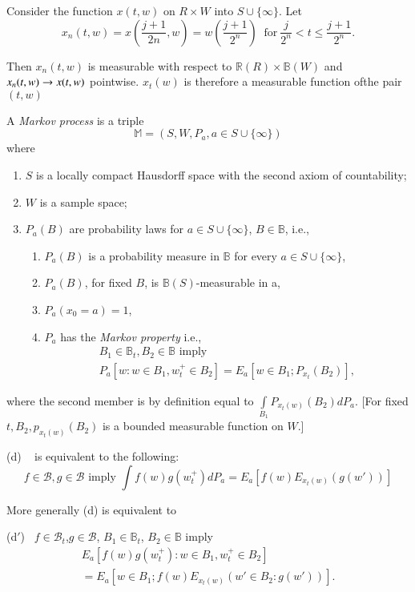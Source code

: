 Consider the function $x (t, w)$ on $R \times W$ into $S \cup \{\infty
\}$. Let  
$$
x_n (t, w) = x \left(\frac{j +1}{2n}, w \right)= w \left(\frac{j +
  1}{2^n}\right) ~\text{ for}~ \frac{j }{2^n}< t \leq \frac{j + 1}{2^n }. 
$$

Then $x_n (t, w)$ is measurable with respect to $\mathbb{R}(R) \times
\mathbb{B}(W)$ and $x_n (t, w)\break \to x (t, w)$ pointwise. $x_t (w)$ is
therefore a measurable function of\pageoriginale the pair $(t, w)$  

\begin{defi*}
A {\em Markov process} is a triple 
  $$
  \mathbb{M} = (S, W, P_a , a \in S \cup \{\infty \})
  $$
  where 
  \begin{enumerate}
\renewcommand{\labelenumi}{(\theenumi)}
  \item $S$ is a locally compact Hausdorff space with the second axiom
    of countability;  
  \item $W$ is  a sample space; 
  \item $P_a (B)$ are probability laws for $a \in S \cup \{\infty \}$,
    $B \in \mathbb{B}$, i.e.,  
    \begin{enumerate}
    \renewcommand{\labelenumii}{(\theenumii)}
    \item $P_a (B)$ is a probability measure in $\mathbb{B}$ for every
      $a \in S \cup \{\infty \}$,  
    \item $P_a (B)$, for fixed $B$, is $\mathbb{B}(S)$-measurable in a, 
    \item $P_a (x_0 = a ) = 1$, 
    \item $P_a$ has the {\em Markov property} i.e., 
\begin{gather*}
B_1 \in \mathbb{B} _t , B_2 \in \mathbb{B} \text{ \ imply}\\
 P_a [ w: w \in B_1, w^+ _t \in B_2] = E_a [ w \in B_1; P_{x_t}(B_2)], 
\end{gather*}
    \end{enumerate}
  \end{enumerate}
\noindent
  where the second member is by definition equal to
    $\int\limits_{B_1} P_{x_t(w)} (B_2)dP_a$.  
    [For fixed $t, B_2, p_{x_t (w)}(B_2)$ is a bounded measurable
      function on $W$.] 
\end{defi*}

\setcounter{rem}{0}
\begin{rem}\label{chap1-sec1-rem1}%
  (d) ~ is equivalent to the following: 
  $$
  f \in \mathscr{B}, g \in \mathscr{B} \text{\ imply\ } \int f (w)g
  (w^+ _t) dP_a = 
  E_a [f (w) E_{x_t (w)}(g(w'))] 
  $$
  
More generally (d) is equivalent to  

(d$'$)~  $f \in
  \mathscr{B}_t$,\pageoriginale $g \in \mathscr{B}$, $B_1 \in 
  \mathbb{B}_t$, $B_2 \in \mathbb{B}$ imply  
  \begin{multline*}
    E_a [ f (w) g (w^+ _t) : w \in B_1, w^+ _t \in B_2]\\ 
    = E_a [ w \in B_1 ; f (w) E_{x_t (w)} (w' \in B_2: g (w'))].  
  \end{multline*}
\end{rem}

